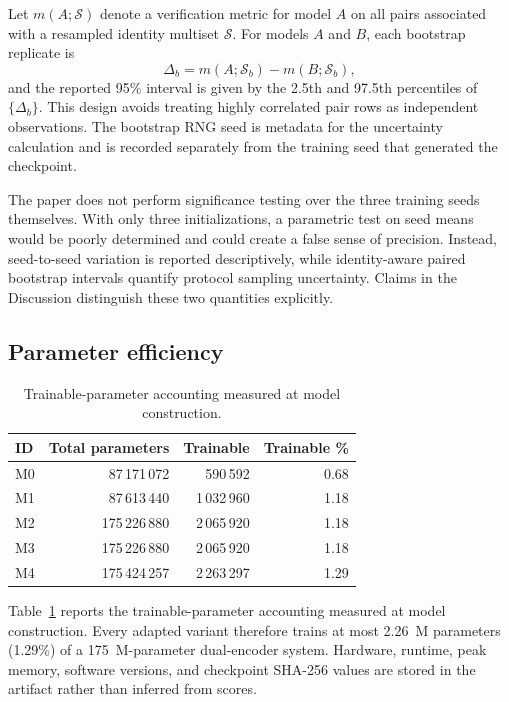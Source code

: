 ﻿\documentclass[10pt,journal,compsoc]{IEEEtran}
\begin{document}
Let $m(A;\mathcal{S})$ denote a verification metric for model $A$ on all pairs associated with a resampled identity multiset $\mathcal{S}$. For models $A$ and $B$, each bootstrap replicate is
\begin{equation}
 \Delta_b=m(A;\mathcal{S}_b)-m(B;\mathcal{S}_b),
\end{equation}
and the reported 95\% interval is given by the 2.5th and 97.5th percentiles of $\{\Delta_b\}$. This design avoids treating highly correlated pair rows as independent observations. The bootstrap RNG seed is metadata for the uncertainty calculation and is recorded separately from the training seed that generated the checkpoint.

The paper does not perform significance testing over the three training seeds themselves. With only three initializations, a parametric test on seed means would be poorly determined and could create a false sense of precision. Instead, seed-to-seed variation is reported descriptively, while identity-aware paired bootstrap intervals quantify protocol sampling uncertainty. Claims in the Discussion distinguish these two quantities explicitly.

\subsection{Parameter efficiency}
\begin{table}[h]
\centering
\caption{Trainable-parameter accounting measured at model construction.}
\label{tab:params}
\begin{tabular}{lrrr}
\toprule
ID & Total parameters & Trainable & Trainable \%\\
\midrule
M0 & 87\,171\,072 & 590\,592 & 0.68\\
M1 & 87\,613\,440 & 1\,032\,960 & 1.18\\
M2 & 175\,226\,880 & 2\,065\,920 & 1.18\\
M3 & 175\,226\,880 & 2\,065\,920 & 1.18\\
M4 & 175\,424\,257 & 2\,263\,297 & 1.29\\
\bottomrule
\end{tabular}
\end{table}

Table~\ref{tab:params} reports the trainable-parameter accounting measured at model construction. Every adapted variant therefore trains at most 2.26~M parameters (1.29\%) of a 175~M-parameter dual-encoder system. Hardware, runtime, peak memory, software versions, and checkpoint SHA-256 values are stored in the artifact rather than inferred from scores.
\end{document}
